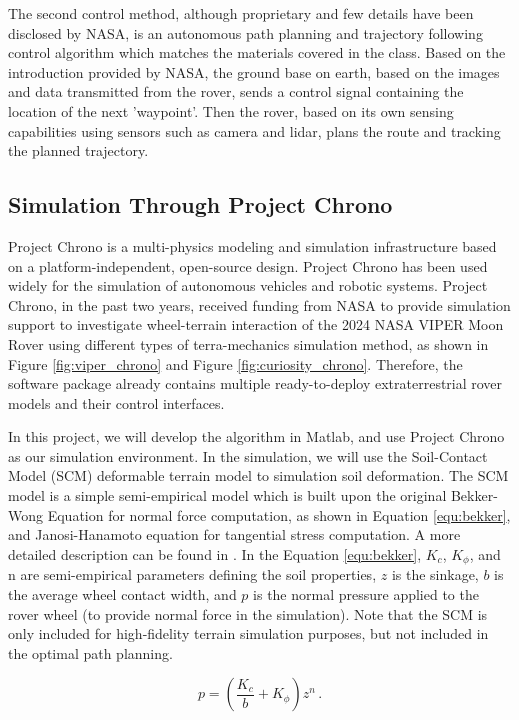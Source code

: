 \documentclass{article}
\begin{document}
The second control method, although proprietary and few details have been disclosed by NASA, is an autonomous path planning and trajectory following control algorithm which matches the materials covered in the class. Based on the introduction provided by NASA, the ground base on earth, based on the images and data transmitted from the rover, sends a control signal containing the location of the next 'waypoint'. Then the rover, based on its own sensing capabilities using sensors such as camera and lidar, plans the route and tracking the planned trajectory. \cite{NASAweb}

\subsection{Simulation Through Project Chrono}
\label{subsec:chrono}
Project Chrono is a multi-physics modeling and simulation infrastructure based on a platform-independent, open-source design. Project Chrono has been used widely for the simulation of autonomous vehicles and robotic systems. Project Chrono, in the past two years, received funding from NASA to provide simulation support to investigate wheel-terrain interaction of the 2024 NASA VIPER Moon Rover using different types of terra-mechanics simulation method, as shown in Figure \ref{fig:viper_chrono} and Figure \ref{fig:curiosity_chrono}. Therefore, the software package already contains multiple ready-to-deploy extraterrestrial rover models and their control interfaces. 

In this project, we will develop the algorithm in Matlab, and use Project Chrono as our simulation environment. In the simulation, we will use the Soil-Contact Model (SCM) deformable terrain model to simulation soil deformation. The SCM model is a simple semi-empirical model which is built upon the original Bekker-Wong Equation for normal force computation, as shown in Equation \ref{equ:bekker}, and Janosi-Hanamoto equation for tangential stress computation. A more detailed description can be found in \cite{10.1115/1.4056851}. In the Equation \ref{equ:bekker}, \(K_{c}\), \(K_{\phi}\), and n are semi-empirical parameters defining the soil properties, \(z\) is the sinkage, \(b\) is the average wheel contact width, and \(p\) is the normal pressure applied to the rover wheel (to provide normal force in the simulation). Note that the SCM is only included for high-fidelity terrain simulation purposes, but not included in the optimal path planning. 

\begin{equation}\label{equ:bekker}
	p = \left( \frac{K_c}{b} + K_\phi \right) z^n \, .
\end{equation}
\end{document}
